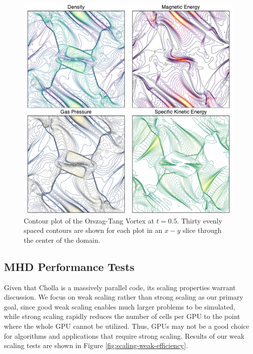 \documentclass[modern, linenumbers]{aastex631}
\newcommand*{\img}[1]{%
    \raisebox{-.3\baselineskip}{%
        \texttt{[image: \#1]}%
    }%
}
\begin{document}
\begin{figure}[!ht]
    \includegraphics[width=\linewidth]{orszag-tang-vortex.pdf}
    \caption{Contour plot of the Orszag-Tang Vortex at $t=0.5$. Thirty evenly spaced contours are shown for each plot in an $x-y$ slice through the center of the domain.  \href{https://github.com/bcaddy/caddy-et-al-2023/blob/8f5051180971c6d63423db42e05c3d1fa1ec9785/python/orszag-tang-vortex.py}{\img{github.png}}}
    \label{fig:otv}
\end{figure}

\subsection{MHD Performance Tests}
\label{sec:mhd-perf-tests}

Given that Cholla is a massively parallel code, its scaling properties warrant discussion. We focus on weak scaling rather than strong scaling as our primary goal, since good weak scaling enables much larger problems to be simulated, while strong scaling rapidly reduces the number of cells per GPU to the point where the whole GPU cannot be utilized. Thus, GPUs may not be a good choice for algorithms and applications that require strong scaling. Results of our weak scaling tests are shown in Figure \ref{fig:scaling-weak-efficiency}.
\end{document}
